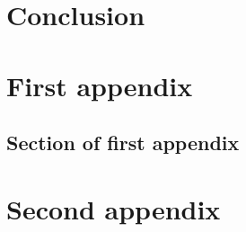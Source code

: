 \documentclass{mproj}
\begin{document}
\chapter{Conclusion}\label{conclusion}

\appendix %
\chapter{First appendix}

\section{Section of first appendix}

\chapter{Second appendix}



\end{document}
